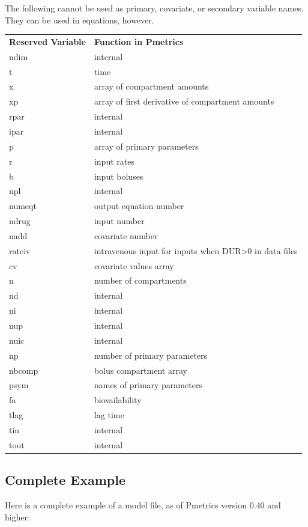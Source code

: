 \documentclass[
]{book}
\begin{document}
The following cannot be used as primary, covariate, or secondary
variable names. They can be used in equations, however.

\begin{longtable}[]{@{}ll@{}}
\toprule
\endhead
\textbf{Reserved Variable} & \textbf{Function in Pmetrics} \\
ndim & internal \\
t & time \\
x & array of compartment amounts \\
xp & array of first derivative of compartment amounts \\
rpar & internal \\
ipar & internal \\
p & array of primary parameters \\
r & input rates \\
b & input boluses \\
npl & internal \\
numeqt & output equation number \\
ndrug & input number \\
nadd & covariate number \\
rateiv & intravenous input for inputs when DUR\textgreater0 in data files \\
cv & covariate values array \\
n & number of compartments \\
nd & internal \\
ni & internal \\
nup & internal \\
nuic & internal \\
np & number of primary parameters \\
nbcomp & bolus compartment array \\
psym & names of primary parameters \\
fa & biovailability \\
tlag & lag time \\
tin & internal \\
tout & internal \\
\bottomrule
\end{longtable}

\hypertarget{completeEx}{%
\subsection{Complete Example}\label{completeEx}}

Here is a complete example of a model file, as of Pmetrics version 0.40
and higher:
\end{document}
